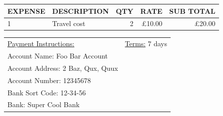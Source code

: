 \documentclass{letter}
\newlength{\totalwidth}\setlength{\totalwidth}{4.5cm}
\begin{document}
\vspace{0.5 cm}

\begingroup\renewcommand{\arraystretch}{1.5}
\begin{tabularx}{\linewidth}{l X r r r}
    \bf{EXPENSE}          & \bf{DESCRIPTION}        & \bf{QTY}               & \bf{RATE} & \bf SUB TOTAL                                 \\[1ex]\hline
    1      & Travel cost     & 2       &  \pounds10.00                & \pounds20.00 \\
\end{tabularx}\endgroup

\par\vspace{2ex}\noindent\hfill\underline{}

\vspace{3 cm}

\begin{tabularx}{\linewidth}{X r}
    \underline{Payment Instructions:} \hspace*{\fill} & \underline{Terms:} 7 days \\
    Account Name: Foo Bar Account                                                   \\Account Address: 2 Baz, Qux, Quux \\Account Number: 12345678 \\Bank Sort Code: 12-34-56 \\Bank: Super Cool Bank
\end{tabularx}
\end{document}
